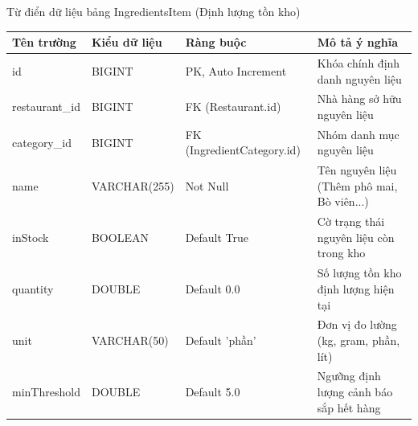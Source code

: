 \documentclass{uetgraduation}
\begin{document}
\begin{table}[!htbp]{Từ điển dữ liệu bảng IngredientsItem (Định lượng tồn kho)}
\centering
\small
\begin{tabularx}{\textwidth}{|>{\raggedright\arraybackslash}p{2.8cm}|>{\raggedright\arraybackslash}p{3.0cm}|>{\raggedright\arraybackslash}p{3.5cm}|>{\raggedright\arraybackslash}X|}
\hline
\textbf{Tên trường} & \textbf{Kiểu dữ liệu} & \textbf{Ràng buộc} & \textbf{Mô tả ý nghĩa} \\ \hline
id & BIGINT & PK, Auto Increment & Khóa chính định danh nguyên liệu \\ \hline
restaurant\_id & BIGINT & FK (Restaurant.id) & Nhà hàng sở hữu nguyên liệu \\ \hline
category\_id & BIGINT & FK (IngredientCategory.id) & Nhóm danh mục nguyên liệu \\ \hline
name & VARCHAR(255) & Not Null & Tên nguyên liệu (Thêm phô mai, Bò viên...) \\ \hline
inStock & BOOLEAN & Default True & Cờ trạng thái nguyên liệu còn trong kho \\ \hline
quantity & DOUBLE & Default 0.0 & Số lượng tồn kho định lượng hiện tại \\ \hline
unit & VARCHAR(50) & Default 'phần' & Đơn vị đo lường (kg, gram, phần, lít) \\ \hline
minThreshold & DOUBLE & Default 5.0 & Ngưỡng định lượng cảnh báo sắp hết hàng \\ \hline
\end{tabularx}
\end{table}
\clearpage
\end{document}
